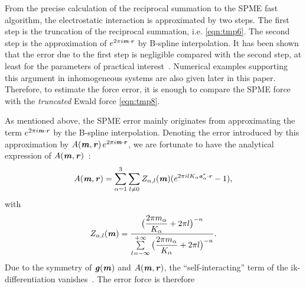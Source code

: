 \documentclass[journal=jacsat,manuscript=article]{achemso}
\newcommand{\redc}[1]{{\color{black} #1}}
\renewcommand{\v}[1]{\textbf{\textit{#1}}}
\begin{document}
From the precise calculation of the reciprocal summation to the SPME
fast algorithm, the electrostatic interaction is approximated by two
steps.  The first step is the truncation of the reciprocal summation,
i.e. \ref{eqn:tmp6}. The second step is the approximation of
$e^{2\pi i\v m\cdot\v r}$ by B-spline
interpolation. It has been shown that the
error due to the first step is negligible \redc{compared} with the second
step,
at least for the parameters of practical interest~\cite{wang2010optimizing}.
Numerical
examples supporting this argument in inhomogeneous systems are also
given later in this paper.  Therefore, to estimate the force
error, it is enough to compare the SPME force with the
\emph{truncated} Ewald force \ref{eqn:tmp8}. 

As mentioned above, the SPME error mainly originates from approximating
the term $e^{2\pi i\v m\cdot\v r}$ by the B-spline
interpolation. Denoting the error introduced by this approximation by
$A(\v m, \v r)\,e^{2\pi i\v m\cdot \v r}$, we are fortunate to have
the analytical expression of $A(\v m, \v r)$~\cite{schoenberg1987cardinal}:
\begin{align}\label{eqn:error-A}
  A(\v m, \v r)
  =
  \sum_{\alpha=1}^3\sum_{l\neq 0}
  Z_{\alpha,l}(\v m)
  (
  e^{2\pi i l K_\alpha\v a^\ast_\alpha\cdot \v r} - 1
  ),
\end{align}
with
\begin{align}
  Z_{\alpha,l}(\v m) = \frac
  {\big(\dfrac{2\pi m_\alpha}{K_\alpha} + 2\pi l\big)^{-n}}
  {\sum\limits_{l=-\infty}^{+\infty}
    \big(\dfrac{2\pi m_\alpha}{K_\alpha} + 2\pi l\big)^{-n}}.
\end{align}
Due to the symmetry of $\v g(\v m)$ and $A(\v m, \v r)$, the
``self-interacting'' term of the
ik-differentiation vanishes~\cite{wang2010optimizing}.
The error force is therefore
\end{document}
